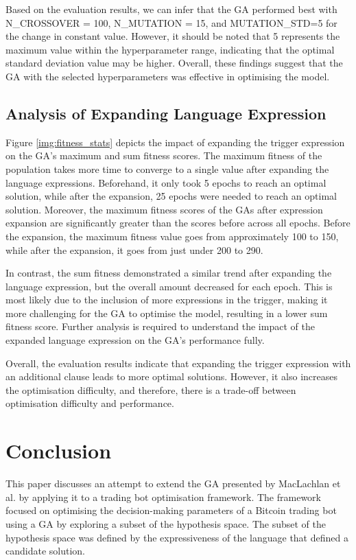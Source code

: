\documentclass{IEEEtran}
\begin{document}
Based on the evaluation results, we can infer that the GA performed best with N\_CROSSOVER = 100, N\_MUTATION = 15, and MUTATION\_STD=5 for the change in constant value. However, it should be noted that 5 represents the maximum value within the hyperparameter range, indicating that the optimal standard deviation value may be higher. Overall, these findings suggest that the GA with the selected hyperparameters was effective in optimising the model.

\subsection{Analysis of Expanding Language Expression} \label{analyse_language}
Figure \ref{img:fitness_stats} depicts the impact of expanding the trigger expression on the GA's maximum and sum fitness scores. The maximum fitness of the population takes more time to converge to a single value after expanding the language expressions. Beforehand, it only took 5 epochs to reach an optimal solution, while after the expansion, 25 epochs were needed to reach an optimal solution. Moreover, the maximum fitness scores of the GAs after expression expansion are significantly greater than the scores before across all epochs. Before the expansion, the maximum fitness value goes from approximately 100 to 150, while after the expansion, it goes from just under 200 to 290.

In contrast, the sum fitness demonstrated a similar trend after expanding the language expression, but the overall amount decreased for each epoch. This is most likely due to the inclusion of more expressions in the trigger, making it more challenging for the GA to optimise the model, resulting in a lower sum fitness score. Further analysis is required to understand the impact of the expanded language expression on the GA's performance fully.

Overall, the evaluation results indicate that expanding the trigger expression with an additional clause leads to more optimal solutions. However, it also increases the optimisation difficulty, and therefore, there is a trade-off between optimisation difficulty and performance.



\section{Conclusion} \label{conclusion}
This paper discusses an attempt to extend the GA presented by MacLachlan et al. by applying it to a trading bot optimisation framework. The framework focused on optimising the decision-making parameters of a Bitcoin trading bot using a GA by exploring a subset of the hypothesis space. The subset of the hypothesis space was defined by the expressiveness of the language that defined a candidate solution. 
\end{document}
